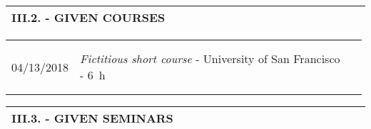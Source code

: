 \documentclass[11pt, letterpaper]{extarticle}
\begin{document}

	\label{sec:III.2.}
	\begin{longtable}{C{1.012\linewidth}N}
		\textbf{\large III.2. - GIVEN COURSES} & \\[0.70cm] \hline
	\end{longtable}

	\begin{longtable}{C{0.154\linewidth}C{0.834\linewidth}N}
		                                                             &                                                                                                                                                                                                                                                  & \\[-0.25cm]
		                                                             &                                                                                                                                                                                                                                                  & \\[-0.25cm]
		04/13/2018                                                   & \textit{Fictitious short course} - University of San Francisco - 6~h                                                                                                                                                                             & \\
		                                                             &                                                                                                                                                                                                                                                  & \\[-0.25cm]
		                                                             &                                                                                                                                                                                                                                                  & \\[-0.25cm] \hline
	\end{longtable}


	\label{sec:III.3.}
	\begin{longtable}{C{1.012\linewidth}N}
		\textbf{\large III.3. - GIVEN SEMINARS} & \\[0.70cm] \hline
	\end{longtable}
\end{document}
